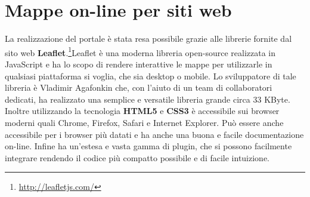 \documentclass[a4paper,11pt]{article}
\begin{document}
\newpage

\section{Mappe on-line per siti web}
\label{sec:3}
La realizzazione del portale è stata resa possibile grazie alle librerie fornite dal sito web \textbf{Leaflet}.\footnote{\url{http://leafletjs.com/}}\newline Leaflet è una moderna libreria open-source realizzata in JavaScript e ha lo scopo di rendere interattive le mappe per utilizzarle in qualsiasi piattaforma si voglia, che sia desktop o mobile. Lo sviluppatore di tale libreria è Vladimir Agafonkin che, con l'aiuto di un team di collaboratori dedicati, ha realizzato una semplice e versatile libreria grande circa 33 KByte. Inoltre utilizzando la tecnologia \textbf{HTML5} e \textbf{CSS3} è accessibile sui browser moderni quali Chrome, Firefox, Safari e Internet Explorer. Può essere anche accessibile per i browser più datati e ha anche una buona e facile documentazione on-line. Infine ha un'estesa e vasta gamma di plugin, che si possono facilmente integrare rendendo il codice più compatto possibile e di facile intuizione.
\end{document}
